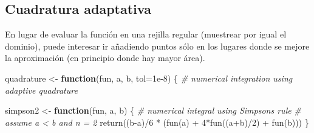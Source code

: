 \documentclass[
]{book}
\newenvironment{Shaded}{\begin{snugshade}}{\end{snugshade}}
\newcommand{\AttributeTok}[1]{\textcolor[rgb]{0.77,0.63,0.00}{#1}}
\newcommand{\CommentTok}[1]{\textcolor[rgb]{0.56,0.35,0.01}{\textit{#1}}}
\newcommand{\ControlFlowTok}[1]{\textcolor[rgb]{0.13,0.29,0.53}{\textbf{#1}}}
\newcommand{\DecValTok}[1]{\textcolor[rgb]{0.00,0.00,0.81}{#1}}
\newcommand{\FloatTok}[1]{\textcolor[rgb]{0.00,0.00,0.81}{#1}}
\newcommand{\FunctionTok}[1]{\textcolor[rgb]{0.00,0.00,0.00}{#1}}
\newcommand{\NormalTok}[1]{#1}
\newcommand{\OtherTok}[1]{\textcolor[rgb]{0.56,0.35,0.01}{#1}}
\newcommand{\SpecialCharTok}[1]{\textcolor[rgb]{0.00,0.00,0.00}{#1}}
\theoremstyle{break}
\theoremstyle{nonumberplain}
\begin{document}
\hypertarget{cuadratura-adaptativa}{%
\subsection{Cuadratura adaptativa}\label{cuadratura-adaptativa}}

En lugar de evaluar la función en una rejilla regular (muestrear por igual el dominio),
puede interesar ir añadiendo puntos sólo en los lugares donde se mejore la aproximación
(en principio donde hay mayor área).

\begin{Shaded}
\begin{Highlighting}[]
\NormalTok{quadrature }\OtherTok{\textless{}{-}} \ControlFlowTok{function}\NormalTok{(fun, a, b, }\AttributeTok{tol=}\FloatTok{1e{-}8}\NormalTok{) \{}
    \CommentTok{\# numerical integration using adaptive quadrature}

\NormalTok{  simpson2 }\OtherTok{\textless{}{-}} \ControlFlowTok{function}\NormalTok{(fun, a, b) \{}
    \CommentTok{\# numerical integral using Simpson\textquotesingle{}s rule}
    \CommentTok{\# assume a \textless{} b and n = 2}
    \FunctionTok{return}\NormalTok{((b}\SpecialCharTok{{-}}\NormalTok{a)}\SpecialCharTok{/}\DecValTok{6} \SpecialCharTok{*}\NormalTok{ (}\FunctionTok{fun}\NormalTok{(a) }\SpecialCharTok{+} \DecValTok{4}\SpecialCharTok{*}\FunctionTok{fun}\NormalTok{((a}\SpecialCharTok{+}\NormalTok{b)}\SpecialCharTok{/}\DecValTok{2}\NormalTok{) }\SpecialCharTok{+} \FunctionTok{fun}\NormalTok{(b)))}
\NormalTok{  \}}
 

\end{Highlighting}
\end{Shaded}
\end{document}
